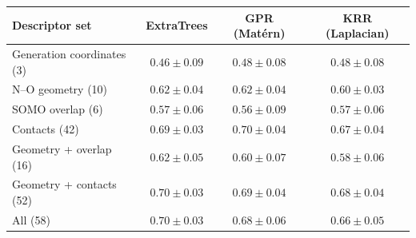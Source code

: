 \begin{tabular}{lccc}
\toprule
Descriptor set & ExtraTrees & GPR (Mat\'ern) & KRR (Laplacian)\\
\midrule
Generation coordinates (3) & $0.46\pm0.09$ & $0.48\pm0.08$ & $0.48\pm0.08$\\
N--O geometry (10) & $0.62\pm0.04$ & $0.62\pm0.04$ & $0.60\pm0.03$\\
SOMO overlap (6) & $0.57\pm0.06$ & $0.56\pm0.09$ & $0.57\pm0.06$\\
Contacts (42) & $0.69\pm0.03$ & $0.70\pm0.04$ & $0.67\pm0.04$\\
Geometry + overlap (16) & $0.62\pm0.05$ & $0.60\pm0.07$ & $0.58\pm0.06$\\
Geometry + contacts (52) & $0.70\pm0.03$ & $0.69\pm0.04$ & $0.68\pm0.04$\\
All (58) & $0.70\pm0.03$ & $0.68\pm0.06$ & $0.66\pm0.05$\\
\bottomrule
\end{tabular}
